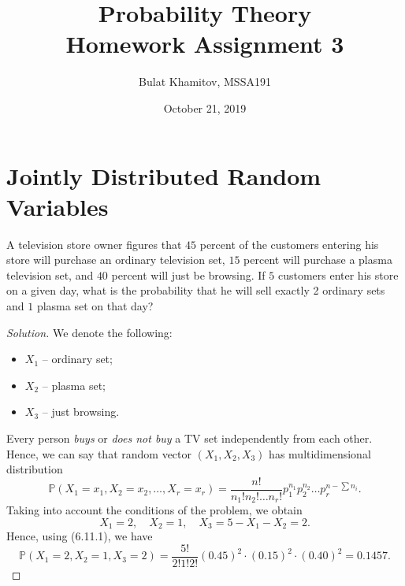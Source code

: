 \documentclass{article}[12pt]
\title{Probability Theory \\ Homework Assignment 3}
\author{Bulat Khamitov, MSSA191}
\date{October 21, 2019}
\newenvironment{solution}
  {\renewcommand\qedsymbol{$\blacksquare$}\begin{proof}[Solution]}
  {\end{proof}}
\newenvironment{problem}[1]
  {\renewcommand\theinnercustomprblm{#1}\innercustomprblm}
  {\endinnercustomprblm}
\renewcommand{\P}{\mathbb{P}}
\begin{document}
\maketitle

\section{Jointly Distributed Random Variables}

\begin{problem}{6.11}\normalfont
A television store owner figures that $45$ percent of the customers entering his store will purchase an ordinary television set, $15$ percent will purchase a plasma television set, and $40$ percent will just be browsing. 
If $5$ customers enter his store on a given day, what is the probability that he will sell exactly 2 ordinary sets and $1$ plasma set on that day?
\end{problem}
\begin{solution}
We denote the following:
\begin{itemize}
    \item $X_{1}$ -- ordinary set;
    \item $X_{2}$ -- plasma set;
    \item $X_{3}$ -- just browsing.
\end{itemize}
Every person \textit{buys} or \textit{does not buy} a TV set independently from each other.
Hence, we can say that random vector $(X_{1}, X_{2}, X_{3})$ has multidimensional distribution
\begin{equation*}
    \P(X_{1} = x_{1}, X_{2} = x_{2}, \ldots, X_{r} = x_{r}) = \frac{n!}{n_{1}!n_{2}!\ldots n_{r}!}p_{1}^{n_{1}}p_{2}^{n_{2}}\ldots p_{r}^{n - \sum n_{i}}.\tag{6.11.1}
\end{equation*}
Taking into account the conditions of the problem, we obtain
\begin{equation*}
    X_{1} = 2,\quad X_{2} = 1,\quad X_{3} = 5 - X_{1} - X_{2} = 2.
\end{equation*}
Hence, using (6.11.1), we have
\begin{equation*}
    \P(X_{1} = 2, X_{2} = 1, X_{3} = 2) = \frac{5!}{2!1!2!}(0.45)^{2}\cdot(0.15)^{2}\cdot(0.40)^{2} = 0.1457.
\end{equation*}
\end{solution}
\end{document}
